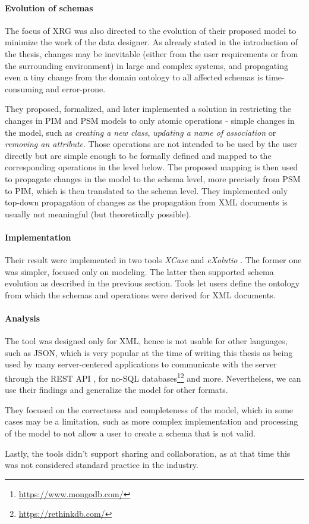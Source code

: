\paragraph{Evolution of schemas} The focus of XRG was also directed to the evolution \cite{nevcasky2012evolution} of their proposed model to minimize the work of the data designer. As already stated in the introduction of the thesis, changes may be inevitable (either from the user requirements or from the surrounding environment) in large and complex systems, and propagating even a tiny change from the domain ontology to all affected schemas is time-consuming and error-prone.

They proposed, formalized, and later implemented a solution in restricting the changes in PIM and PSM models to only atomic operations - simple changes in the model, such as \textit{creating a new class}, \textit{updating a name of association} or \textit{removing an attribute}. Those operations are not intended to be used by the user directly but are simple enough to be formally defined and mapped to the corresponding operations in the level below. The proposed mapping is then used to propagate changes in the model to the schema level, more precisely from PSM to PIM, which is then translated to the schema level. They implemented only top-down propagation of changes as the propagation from XML documents is usually not meaningful (but theoretically possible).

\paragraph{Implementation} Their result were implemented in two tools \textit{XCase} \cite{xcase} and \textit{eXolutio} \cite{exolutio}. The former one was simpler, focused only on modeling. The latter then supported schema evolution as described in the previous section. Tools let users define the ontology from which the schemas and operations were derived for XML documents.

\paragraph{Analysis} The tool was designed only for XML, hence is not usable for other languages, such as JSON, which is very popular at the time of writing this thesis as being used by many server-centered applications to communicate with the server through the REST API \cite{fielding2000architectural}, for no-SQL databases\footnote{\url{https://www.mongodb.com/}}\footnote{\url{https://rethinkdb.com/}} and more. Nevertheless, we can use their findings and generalize the model for other formats.

They focused on the correctness and completeness of the model, which in some cases may be a limitation, such as more complex implementation and processing of the model to not allow a user to create a schema that is not valid.

Lastly, the tools didn't support sharing and collaboration, as at that time this was not considered standard practice in the industry.